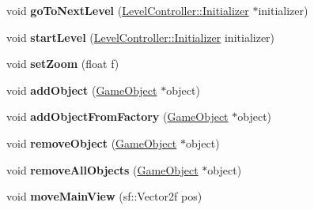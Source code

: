 \begin{DoxyCompactItemize}
\item 
\hypertarget{class_level_controller_a9cb1f95fee01739d9658801dfebb43b1}{void {\bfseries go\+To\+Next\+Level} (\hyperlink{class_level_controller_1_1_initializer}{Level\+Controller\+::\+Initializer} $\ast$initializer)}\label{class_level_controller_a9cb1f95fee01739d9658801dfebb43b1}

\item 
\hypertarget{class_level_controller_a0b8f10e66f7b97615c92340e10f77a07}{void {\bfseries start\+Level} (\hyperlink{class_level_controller_1_1_initializer}{Level\+Controller\+::\+Initializer} initializer)}\label{class_level_controller_a0b8f10e66f7b97615c92340e10f77a07}

\item 
\hypertarget{class_level_controller_a1235128f78023483b022bab8e2b0125c}{void {\bfseries set\+Zoom} (float f)}\label{class_level_controller_a1235128f78023483b022bab8e2b0125c}

\item 
\hypertarget{class_level_controller_a230987fb618cc9949974a4f4b994bbc1}{void {\bfseries add\+Object} (\hyperlink{class_game_object}{Game\+Object} $\ast$object)}\label{class_level_controller_a230987fb618cc9949974a4f4b994bbc1}

\item 
\hypertarget{class_level_controller_afd60c294955bc06dafac9f5ea146c53d}{void {\bfseries add\+Object\+From\+Factory} (\hyperlink{class_game_object}{Game\+Object} $\ast$object)}\label{class_level_controller_afd60c294955bc06dafac9f5ea146c53d}

\item 
\hypertarget{class_level_controller_ad8894683730d484c0ba359c0ee88b219}{void {\bfseries remove\+Object} (\hyperlink{class_game_object}{Game\+Object} $\ast$object)}\label{class_level_controller_ad8894683730d484c0ba359c0ee88b219}

\item 
\hypertarget{class_level_controller_a3f33f48f2476ad4a68ad5880ea02db22}{void {\bfseries remove\+All\+Objects} (\hyperlink{class_game_object}{Game\+Object} $\ast$object)}\label{class_level_controller_a3f33f48f2476ad4a68ad5880ea02db22}

\item 
\hypertarget{class_level_controller_abd5d6b2ae138b8e086e890fddf46ccef}{void {\bfseries move\+Main\+View} (sf\+::\+Vector2f pos)}\label{class_level_controller_abd5d6b2ae138b8e086e890fddf46ccef}


\end{DoxyCompactItemize}
